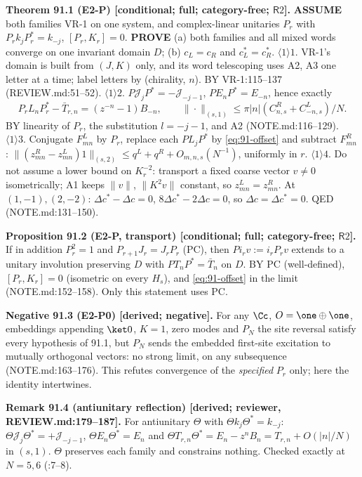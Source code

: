 \textbf{Theorem 91.1 (E2-P) [conditional; full; category-free; \(\mathsf R2\)].}  \textbf{ASSUME} both families VR-1
on one system, and complex-linear unitaries \(P_r\) with \(P_rk_jP_r^*=k_{-j}\), \([P_r,K_r]=0\).  \textbf{PROVE} (a) both
families and all mixed words converge on one invariant domain \(D\); (b) \(c_L=c_R\) and \(c_L^*=c_R^*\).
\(\langle1\rangle1\). VR-1's domain is built from \((J,K)\) only, and its word telescoping uses A2, A3 one letter at a
time; label letters by (chirality, \(n\)).  BY VR-1:115--137 (REVIEW.md:51--52).
\(\langle1\rangle2\). \(P\mathcal J_jP^*=-\mathcal J_{-j-1}\), \(PE_nP^*=E_{-n}\), hence exactly
\begin{equation}\label{eq:91-offset}
  P_rL_nP_r^*-\bar T_{r,n}=(z^{-n}-1)B_{-n},\qquad \|\cdot\|_{(s,1)}\le\pi|n|(C^R_{n,s}+C^L_{-n,s})/N.
\end{equation}
BY linearity of \(P_r\), the substitution \(l=-j-1\), and A2 (NOTE.md:116--129).
\(\langle1\rangle3\). Conjugate \(F^L_{mn}\) by \(P_r\), replace each \(PL_jP^*\) by \eqref{eq:91-offset} and subtract
\(F^R_{mn}\): \(\|(z^R_{mn}-z^L_{mn})1\|_{(s,2)}\le q^L+q^R+O_{m,n,s}(N^{-1})\), uniformly in \(r\).
\(\langle1\rangle4\). Do not assume a lower bound on \(K_r^{-2}\): transport a fixed coarse vector \(v\neq0\)
isometrically; A1 keeps \(\|v\|\), \(\|K^2v\|\) constant, so \(z^L_{mn}=z^R_{mn}\).  At \((1,-1),(2,-2)\):
\(\Delta c^*-\Delta c=0\), \(8\Delta c^*-2\Delta c=0\), so \(\Delta c=\Delta c^*=0\).  QED (NOTE.md:131--150).

\textbf{Proposition 91.2 (E2-P, transport) [conditional; full; category-free; \(\mathsf R2\)].}  If in addition
\(P_r^2=1\) and \(P_{r+1}J_r=J_rP_r\) (PC), then \(Pi_rv:=i_rP_rv\) extends to a unitary involution preserving \(D\) with
\(PT_nP^*=\bar T_n\) on \(D\).  BY PC (well-defined), \([P_r,K_r]=0\) (isometric on every \(H_s\)), and
\eqref{eq:91-offset} in the limit (NOTE.md:152--158).  Only this statement uses PC.

\textbf{Negative 91.3 (E2-P0) [derived; negative].}  For any \(\Cc\), \(O=\one\oplus\one\), embeddings appending
\(\ket0\), \(K=1\), zero modes and \(P_N\) the site reversal satisfy every hypothesis of 91.1, but \(P_N\) sends the
embedded first-site excitation to mutually orthogonal vectors: no strong limit, on any subsequence
(NOTE.md:163--176).  This refutes convergence of the \emph{specified} \(P_r\) only; here the identity intertwines.

\textbf{Remark 91.4 (antiunitary reflection) [derived; reviewer, REVIEW.md:179--187].}  For antiunitary \(\Theta\) with
\(\Theta k_j\Theta^*=k_{-j}\): \(\Theta\mathcal J_j\Theta^*=+\mathcal J_{-j-1}\), \(\Theta E_n\Theta^*=E_n\) and
\(\Theta T_{r,n}\Theta^*=E_n-z^nB_n=T_{r,n}+O(|n|/N)\) in \((s,1)\).  \(\Theta\) preserves each family and constrains
nothing.  Checked exactly at \(N=5,6\) (:7--8).


